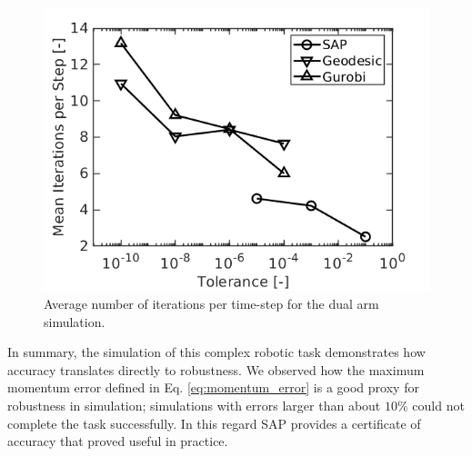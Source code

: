 \begin{figure}[!h]
	\centering
    \includegraphics[width=0.7\columnwidth]{figures/dual_arm/iterations_per_step.png}
    \caption{\label{fig:dual_arm_iterations} Average number of iterations per
    time-step for the dual arm simulation.}
\end{figure}

In summary, the simulation of this complex robotic task demonstrates how
accuracy translates directly to robustness. We observed how the maximum momentum
error defined in Eq. \eqref{eq:momentum_error} is a good proxy for robustness in
simulation; simulations with errors larger than about $10\%$ could not complete
the task successfully. In this regard SAP provides a certificate of accuracy
that proved useful in practice.

